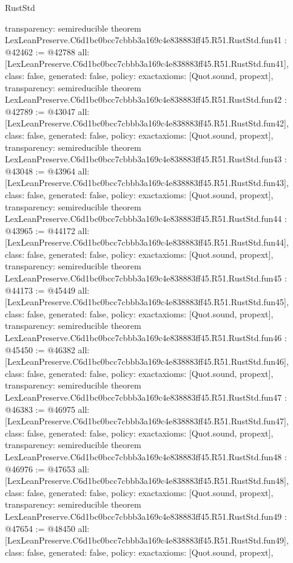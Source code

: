 \begin{lexlean}{RustStd}
\begin{coremodule}
{  transparency: semireducible
}
theorem LexLeanPreserve.C6d1bc0bcc7cbbb3a169c4e838883ff45.R51.RustStd.fun41 : @42462 := @42788 {
  all: [LexLeanPreserve.C6d1bc0bcc7cbbb3a169c4e838883ff45.R51.RustStd.fun41],
  class: false,
  generated: false,
  policy: exact{axioms: [Quot.sound, propext]},
  transparency: semireducible
}
theorem LexLeanPreserve.C6d1bc0bcc7cbbb3a169c4e838883ff45.R51.RustStd.fun42 : @42789 := @43047 {
  all: [LexLeanPreserve.C6d1bc0bcc7cbbb3a169c4e838883ff45.R51.RustStd.fun42],
  class: false,
  generated: false,
  policy: exact{axioms: [Quot.sound, propext]},
  transparency: semireducible
}
theorem LexLeanPreserve.C6d1bc0bcc7cbbb3a169c4e838883ff45.R51.RustStd.fun43 : @43048 := @43964 {
  all: [LexLeanPreserve.C6d1bc0bcc7cbbb3a169c4e838883ff45.R51.RustStd.fun43],
  class: false,
  generated: false,
  policy: exact{axioms: [Quot.sound, propext]},
  transparency: semireducible
}
theorem LexLeanPreserve.C6d1bc0bcc7cbbb3a169c4e838883ff45.R51.RustStd.fun44 : @43965 := @44172 {
  all: [LexLeanPreserve.C6d1bc0bcc7cbbb3a169c4e838883ff45.R51.RustStd.fun44],
  class: false,
  generated: false,
  policy: exact{axioms: [Quot.sound, propext]},
  transparency: semireducible
}
theorem LexLeanPreserve.C6d1bc0bcc7cbbb3a169c4e838883ff45.R51.RustStd.fun45 : @44173 := @45449 {
  all: [LexLeanPreserve.C6d1bc0bcc7cbbb3a169c4e838883ff45.R51.RustStd.fun45],
  class: false,
  generated: false,
  policy: exact{axioms: [Quot.sound, propext]},
  transparency: semireducible
}
theorem LexLeanPreserve.C6d1bc0bcc7cbbb3a169c4e838883ff45.R51.RustStd.fun46 : @45450 := @46382 {
  all: [LexLeanPreserve.C6d1bc0bcc7cbbb3a169c4e838883ff45.R51.RustStd.fun46],
  class: false,
  generated: false,
  policy: exact{axioms: [Quot.sound, propext]},
  transparency: semireducible
}
theorem LexLeanPreserve.C6d1bc0bcc7cbbb3a169c4e838883ff45.R51.RustStd.fun47 : @46383 := @46975 {
  all: [LexLeanPreserve.C6d1bc0bcc7cbbb3a169c4e838883ff45.R51.RustStd.fun47],
  class: false,
  generated: false,
  policy: exact{axioms: [Quot.sound, propext]},
  transparency: semireducible
}
theorem LexLeanPreserve.C6d1bc0bcc7cbbb3a169c4e838883ff45.R51.RustStd.fun48 : @46976 := @47653 {
  all: [LexLeanPreserve.C6d1bc0bcc7cbbb3a169c4e838883ff45.R51.RustStd.fun48],
  class: false,
  generated: false,
  policy: exact{axioms: [Quot.sound, propext]},
  transparency: semireducible
}
theorem LexLeanPreserve.C6d1bc0bcc7cbbb3a169c4e838883ff45.R51.RustStd.fun49 : @47654 := @48450 {
  all: [LexLeanPreserve.C6d1bc0bcc7cbbb3a169c4e838883ff45.R51.RustStd.fun49],
  class: false,
  generated: false,
  policy: exact{axioms: [Quot.sound, propext]},
}
\end{coremodule}
\end{lexlean}
